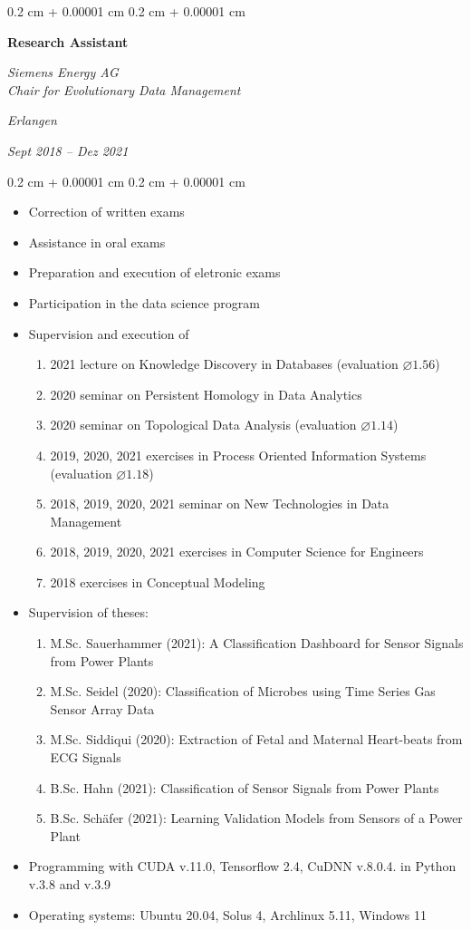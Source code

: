 \documentclass[10pt, letterpaper]{article}
\newenvironment{highlights}{
    \begin{itemize}[
        topsep=0.10 cm,
        parsep=0.10 cm,
        partopsep=0pt,
        itemsep=0pt,
        leftmargin=0.4 cm + 10pt
    ]
}{
    \end{itemize}
}
\newenvironment{onecolentry}{
    \begin{adjustwidth}{
        0.2 cm + 0.00001 cm
    }{
        0.2 cm + 0.00001 cm
    }
}{
    \end{adjustwidth}
}
\newenvironment{twocolentry}[2][]{
    \onecolentry
    \def\secondColumn{#2}
    \setcolumnwidth{\fill, 4.5 cm}
    \begin{paracol}{2}
}{
    \switchcolumn \raggedleft \secondColumn
    \end{paracol}
    \endonecolentry
}
\begin{document}
\begin{twocolentry}{
    \textit{Erlangen}    
    
    \textit{Sept 2018 – Dez 2021}}
    \textbf{Research Assistant}
    
    \textit{Siemens Energy AG \\ Chair for Evolutionary Data Management}
\end{twocolentry}

\vspace{0.10 cm}
\begin{onecolentry}
	\begin{highlights}
		\item Correction of written exams
        \item Assistance in oral exams
        \item Preparation and execution of eletronic exams
        \item Participation in the data science program
        \item Supervision and execution of
        \begin{enumerate}
            \item 2021 lecture on Knowledge Discovery in Databases (evaluation $\varnothing 1.56$)
            \item 2020 seminar on Persistent Homology in Data Analytics
            \item 2020 seminar on Topological Data Analysis (evaluation $\varnothing 1.14$)
            \item 2019, 2020, 2021 exercises in Process Oriented Information Systems (evaluation $\varnothing 1.18$)
            \item 2018, 2019, 2020, 2021 seminar on New Technologies in Data Management
            \item 2018, 2019, 2020, 2021 exercises in Computer Science for Engineers
            \item 2018 exercises in Conceptual Modeling
        \end{enumerate}
        \item Supervision of theses:
        \begin{enumerate}
            \item M.Sc. Sauerhammer (2021): A Classification Dashboard for Sensor Signals from Power Plants
            \item M.Sc. Seidel (2020): Classification of Microbes using Time Series Gas Sensor Array Data
            \item M.Sc. Siddiqui (2020): Extraction of Fetal and Maternal Heart-beats from ECG Signals
            \item B.Sc. Hahn (2021): Classification of Sensor Signals from Power Plants
            \item B.Sc. Schäfer (2021): Learning Validation Models from Sensors of a
Power Plant
        \end{enumerate}
        \item Programming with CUDA v.11.0, Tensorflow 2.4, CuDNN v.8.0.4. in Python v.3.8 and v.3.9
        \item Operating systems: Ubuntu 20.04, Solus 4, Archlinux 5.11, Windows 11
	\end{highlights}
\end{onecolentry}
\end{document}
